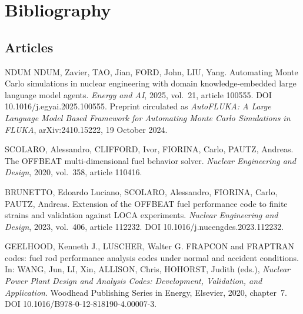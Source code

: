 \documentclass[12pt,a4paper]{report}
\begin{document}
\clearpage
\chapter*{Bibliography}

\vspace{0.6cm}

\section*{Articles}

\begin{list}{}{\setlength{\leftmargin}{1cm}\setlength{\itemindent}{-1cm}}

\item[{[3]}]
NDUM NDUM, Zavier, TAO, Jian, FORD, John, LIU, Yang.
Automating Monte Carlo simulations in nuclear engineering with domain
knowledge-embedded large language model agents.
\textit{Energy and AI}, 2025, vol.~21, article 100555.
DOI 10.1016/j.egyai.2025.100555.
Preprint circulated as \textit{AutoFLUKA: A Large Language Model Based Framework
for Automating Monte Carlo Simulations in FLUKA}, arXiv:2410.15222,
19 October 2024.

  \item[{[1]}]
SCOLARO, Alessandro, CLIFFORD, Ivor, FIORINA, Carlo, PAUTZ, Andreas.
The OFFBEAT multi-dimensional fuel behavior solver.
\textit{Nuclear Engineering and Design}, 2020, vol.~358, article 110416.

\item[{[2]}]
BRUNETTO, Edoardo Luciano, SCOLARO, Alessandro, FIORINA, Carlo, PAUTZ, Andreas.
Extension of the OFFBEAT fuel performance code to finite strains and validation
against LOCA experiments.
\textit{Nuclear Engineering and Design}, 2023, vol.~406, article 112232.
DOI 10.1016/j.nucengdes.2023.112232.



\item[{[4]}]
GEELHOOD, Kenneth J., LUSCHER, Walter G.
FRAPCON and FRAPTRAN codes: fuel rod performance analysis codes under normal and
accident conditions. In: WANG, Jun, LI, Xin, ALLISON, Chris, HOHORST, Judith
(eds.), \textit{Nuclear Power Plant Design and Analysis Codes: Development,
Validation, and Application}. Woodhead Publishing Series in Energy, Elsevier,
2020, chapter~7. DOI 10.1016/B978-0-12-818190-4.00007-3.


\end{list}
\end{document}
